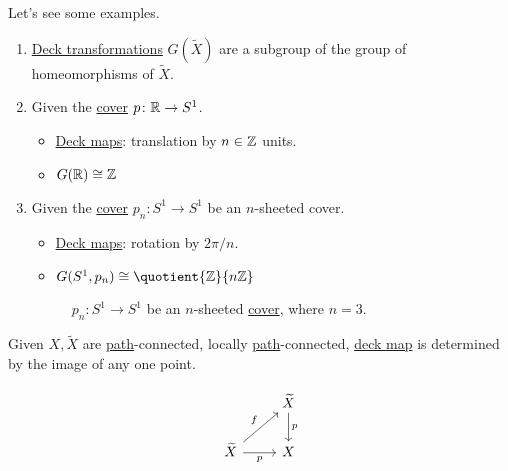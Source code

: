 \begin{eg}
	Let's see some examples.
	\begin{enumerate}
		\item \hyperref[def:deck-transformation]{Deck transformations} \(G(\widetilde{X} )\) are a subgroup of the group of homeomorphisms of \(\widetilde{X} \).
		\item Given the \hyperref[def:covering-map]{cover} \(p\colon \mathbb{\MakeUppercase{r}} \to S^1\).
		      \begin{itemize}
			      \item \hyperref[def:deck-transformation]{Deck maps}: translation by \(n\in \mathbb{\MakeUppercase{z}} \) units.
			      \item \(G(\mathbb{\MakeUppercase{r}} )\cong \mathbb{\MakeUppercase{z}} \)
		      \end{itemize}
		\item Given the \hyperref[def:covering-map]{cover} \(p_{n}\colon S^{1}\to S^1\) be an \(n\)-sheeted cover.
		      \begin{itemize}
			      \item \hyperref[def:deck-transformation]{Deck maps}: rotation by \(2\pi / n\).
			      \item \(G(S^1, p_{n})\cong \quotient{\mathbb{\MakeUppercase{z}} }{n \mathbb{\MakeUppercase{z}} } \)
		      \end{itemize}
		      \begin{figure}[H]
			      \centering
			      \caption{\(p_{n} \colon S^1 \to S^1\) be an \(n\)-sheeted \hyperref[def:covering-map]{cover}, where \(n = 3\).}
			      \label{fig:eg:lec17:N-sheeted-cover}
		      \end{figure}
	\end{enumerate}
\end{eg}

\begin{exercise}\label{ex:lec17}
	Given \(X, \widetilde{X} \) are \hyperref[def:path]{path}-connected, locally \hyperref[def:path]{path}-connected,
	\hyperref[def:deck-transformation]{deck map} is determined by the image of any one point.
\end{exercise}
\begin{answer}
	\[\begin{tikzcd}
			& {\widetilde{X}} \\
			{\widetilde{X}} & X
			\arrow["f", from=2-1, to=1-2]
			\arrow["p"', from=2-1, to=2-2]
			\arrow["p", from=1-2, to=2-2]
		\end{tikzcd}\]
\end{answer}

